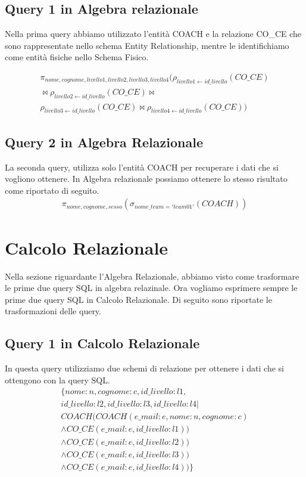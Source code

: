 \documentclass[12pt,a4paper]{article}
\begin{document}
\subsection{Query 1 in Algebra relazionale}
Nella prima query abbiamo utilizzato l'entità COACH e la relazione CO\_CE che sono rappresentate nello schema Entity Relationship, mentre le identifichiamo come entità fisiche nello Schema Fisico.

\begin{equation}
\begin{split}
    \pi_{nome,cognome,livello1,livello2,livello3,livello4}(\rho_{livello1 \leftarrow id\_livello}(CO\_CE) \\ \bowtie \rho_{livello2 \leftarrow id\_livello}(CO\_CE) \bowtie \\ \rho_{livello3 \leftarrow id\_livello}(CO\_CE) \bowtie \rho_{livello4 \leftarrow id\_livello}(CO\_CE))
\end{split}
\end{equation}

\subsection{Query 2 in Algebra Relazionale}
La seconda query, utilizza solo l'entità COACH per recuperare i dati che si vogliono ottenere. In Algebra relazionale possiamo ottenere lo stesso risultato come riportato di seguito.
\begin{equation}
\begin{split}
    \pi_{nome,cognome,sesso}(\sigma_{nome\_team='team01'}(COACH))
\end{split}
\end{equation}
\newpage
\section{Calcolo Relazionale}
Nella sezione riguardante l'Algebra Relazionale, abbiamo visto come trasformare le prime due query SQL in algebra relazinale. Ora vogliamo esprimere sempre le prime due query SQL in Calcolo Relazionale. Di seguito sono riportate le trasformazioni delle query.
\subsection{Query 1 in Calcolo Relazionale}
In questa query utilizziamo due schemi di relazione per ottenere i dati che si ottengono con la query SQL.
\begin{equation}
\begin{split}
\{nome:n,cognome:c,id\_livello:l1,\\id\_livello:l2, id\_livello:l3,id\_livello:l4 | \\ COACH(COACH(e\_mail:e,nome:n,cognome:c) \\ \land CO\_CE(e\_mail:e,id\_livello:l1)) \\ \land CO\_CE(e\_mail:e,id\_livello:l2)) \\ \land CO\_CE(e\_mail:e,id\_livello:l3)) \\ \land CO\_CE(e\_mail:e,id\_livello:l4)) \}
\end{split}
\end{equation}
\end{document}
